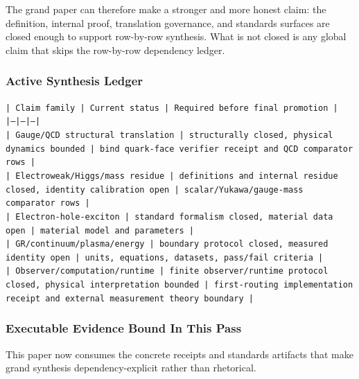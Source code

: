 \documentclass[11pt]{article}
\begin{document}
The grand paper can therefore make a stronger and more honest claim: the definition, internal proof, translation governance, and standards surfaces are closed enough to support row-by-row synthesis. What is not closed is any global claim that skips the row-by-row dependency ledger.

\subsubsection*{Active Synthesis Ledger}

\noindent\texttt{| Claim family | Current status | Required before final promotion |}\\
\noindent\texttt{|---|---|---|}\\
\noindent\texttt{| Gauge/QCD structural translation | structurally closed, physical dynamics bounded | bind quark-face verifier receipt and QCD comparator rows |}\\
\noindent\texttt{| Electroweak/Higgs/mass residue | definitions and internal residue closed, identity calibration open | scalar/Yukawa/gauge-mass comparator rows |}\\
\noindent\texttt{| Electron-hole-exciton | standard formalism closed, material data open | material model and parameters |}\\
\noindent\texttt{| GR/continuum/plasma/energy | boundary protocol closed, measured identity open | units, equations, datasets, pass/fail criteria |}\\
\noindent\texttt{| Observer/computation/runtime | finite observer/runtime protocol closed, physical interpretation bounded | first-routing implementation receipt and external measurement theory boundary |}\\

\subsubsection*{Executable Evidence Bound In This Pass}

This paper now consumes the concrete receipts and standards artifacts that make grand synthesis dependency-explicit rather than rhetorical.
\end{document}
